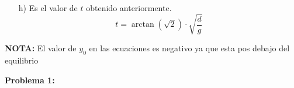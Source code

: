 \documentclass[letterpaper,12pt,addpoints]{exam}
\begin{document}
{\begin{enumerate}
\begin{align*}
U &=\frac{1}{2}kx^2\\
U &=\frac{1}{2} \frac{mg}{d} y_0^2\cos^2\left( \sqrt{\frac{g}{d}}t \right)
\end{align*}
Cuando $U = \frac{1}{2}K$?
\begin{align*}
U &= \frac{1}{2}K\\
\frac{1}{2} \frac{mg}{d} y_0^2\cos^2\left( \sqrt{\frac{g}{d}}t \right)&= \frac{1}{4}m y_0^2 \frac{g}{d}  \sen^2\left( \sqrt{\frac{g}{d}}t \right)\\
\cos^2\left( \sqrt{\frac{g}{d}}t \right)&= \frac{1}{2}   \sen^2\left( \sqrt{\frac{g}{d}}t \right)\\
\frac{\cos^2\left( \sqrt{\frac{g}{d}}t \right)}{\cos^2\left( \sqrt{\frac{g}{d}}t \right)} &= \frac{1}{2}\frac{\sen^2\left( \sqrt{\frac{g}{d}}t \right)}{\cos^2\left( \sqrt{\frac{g}{d}}t \right)}\\
1 &= \frac{1}{2}\tan^2 \left( \sqrt{\frac{g}{d}}t \right)\\
2 &= \tan^2 \left( \sqrt{\frac{g}{d}}t \right)\\
\sqrt{2} &= \tan \left( \sqrt{\frac{g}{d}}t \right)\\
\arctan \left( \sqrt{2} \right) &= \sqrt{\frac{g}{d}}t\\
t &= \arctan \left( \sqrt{2} \right) \cdot \sqrt{\frac{d}{g}}
\end{align*}
Con el valor anterior se evalua en $y\left(\arctan \left( \sqrt{2} \right) \cdot \sqrt{\frac{d}{g}}\right) $

\item[h)] Es el valor de $t$ obtenido anteriormente.
$$t = \arctan \left( \sqrt{2} \right) \cdot \sqrt{\frac{d}{g}}$$

\end{enumerate}

\textbf{NOTA:} El valor de $y_0$ en las ecuaciones es negativo ya que esta pos debajo del equilibrio
}

\clearpage

\textbf{Problema 1:}\\
\end{document}
